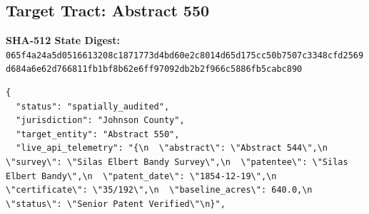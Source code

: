 \documentclass{article}
\begin{document}
\subsection*{Target Tract: Abstract 550}
\textbf{SHA-512 State Digest:}\\
\texttt{065f4a24a5d0516613208c1871773d4bd60e2c8014d65d175cc50b7507c3348cfd2569d684a6e62d766811fb1bf8b62e6ff97092db2b2f966c5886fb5cabc890}
\begin{verbatim}
{
  "status": "spatially_audited",
  "jurisdiction": "Johnson County",
  "target_entity": "Abstract 550",
  "live_api_telemetry": "{\n  \"abstract\": \"Abstract 544\",\n  \"survey\": \"Silas Elbert Bandy Survey\",\n  \"patentee\": \"Silas Elbert Bandy\",\n  \"patent_date\": \"1854-12-19\",\n  \"certificate\": \"35/192\",\n  \"baseline_acres\": 640.0,\n  \"status\": \"Senior Patent Verified\"\n}",

\end{verbatim}
\end{document}

